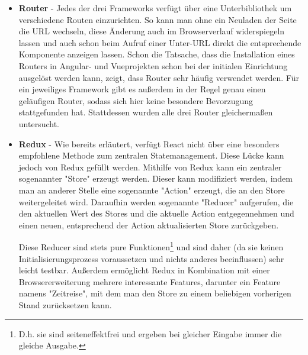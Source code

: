 \begin{itemize}
\item \textbf{Router} - Jedes der drei Frameworks verfügt über eine Unterbibliothek um verschiedene Routen einzurichten. So kann man ohne ein Neuladen der Seite die URL wechseln, diese Änderung auch im Browserverlauf widerspiegeln lassen und auch schon beim Aufruf einer Unter-URL direkt die entsprechende Komponente anzeigen lassen. Schon die Tatsache, dass die Installation eines Routers in Angular- und Vueprojekten schon bei der initialen Einrichtung ausgelöst werden kann, zeigt, dass Router sehr häufig verwendet werden. Für ein jeweiliges Framework gibt es außerdem in der Regel genau einen geläufigen Router, sodass sich hier keine besondere Bevorzugung stattgefunden hat. Stattdessen wurden alle drei Router gleichermaßen untersucht.

%

\item \textbf{Redux} - Wie bereits erläutert, verfügt React nicht über eine besonders empfohlene Methode zum zentralen Statemanagement. Diese Lücke kann jedoch von Redux gefüllt werden. Mithilfe von Redux kann ein zentraler sogenannter "Store" erzeugt werden. Dieser kann modifiziert werden, indem man an anderer Stelle eine sogenannte "Action" erzeugt, die an den Store weitergeleitet wird. Daraufhin werden sogenannte "Reducer" aufgerufen, die den aktuellen Wert des Stores und die aktuelle Action entgegennehmen und einen neuen, entsprechend der Action aktualisierten Store zurückgeben.

Diese Reducer sind stets pure Funktionen\footnote{D.h. sie sind seiteneffektfrei und ergeben bei gleicher Eingabe immer die gleiche Ausgabe.} und sind daher (da sie keinen Initialisierungsprozess voraussetzen und nichts anderes beeinflussen) sehr leicht testbar. Außerdem ermöglicht Redux in Kombination mit einer Browsererweiterung mehrere interessante Features, darunter ein Feature namens "Zeitreise", mit dem man den Store zu einem beliebigen vorherigen Stand zurücksetzen kann.


\end{itemize}
